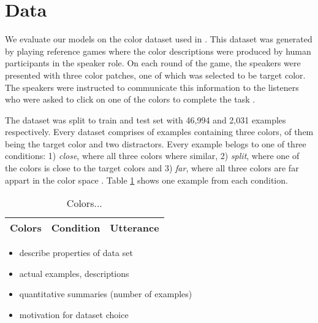 \section{Data}

We evaluate our models on the color dataset used in \citep{monroe-2017-colors}. This dataset was generated by playing reference games where the color descriptions were produced by human participants in the speaker role. On each round of the game, the speakers were presented with three color patches, one of which was selected to be target color. The speakers were instructed to communicate this information to the listeners who were asked to click on one of the colors to complete the task \citep{monroe-2017-colors}.

\par
The dataset was split to train and test set with 46,994 and 2,031 examples respectively. Every dataset comprises of examples containing three colors, of them being the target color and two distractors. Every example belogs to one of three conditions: 1) \emph{close}, where all three colors where similar, 2) \emph{split}, where one of the colors is close to the target colors and 3) \emph{far}, where all three colors are far appart in the color space \citep{monroe-2017-colors}. Table \ref{table:colors} shows one example from each condition.

\begin{table}[ht]
\centering
\renewcommand{\arraystretch}{1}
\begin{tabular}{|l|l|l|}

  \hline
  Colors & Condition & Utterance \\
  \hline

\end{tabular}
\caption[Colors]{Colors...}
\label{table:colors}
\end{table}


\begin{itemize}
  \item describe properties of data set
  \item actual examples, descriptions
  \item quantitative summaries (number of examples)
  \item motivation for dataset choice
\end{itemize}